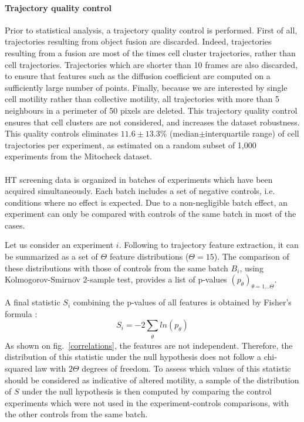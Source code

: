 \paragraph{Trajectory quality control}
 Prior to statistical analysis, a trajectory quality control is performed. First of all, trajectories resulting from object fusion are discarded. Indeed, trajectories resulting from a fusion are most of the times cell cluster trajectories, rather than cell trajectories. Trajectories which are shorter than 10 frames are also discarded, to ensure that features such as the diffusion coefficient are computed on a sufficiently large number of points. Finally, because we are interested by single cell motility rather than collective motility, all trajectories with more than 5 neighbours in a perimeter of 50 pixels are deleted. This trajectory quality control ensures that cell clusters are not considered, and increases the dataset robustness. This quality controls eliminates $11.6\pm 13.3 \%$ (median$\pm$interquartile range) of cell trajectories per experiment, as estimated on a random subset of 1,000 experiments from the Mitocheck dataset.
\paragraph*{}
HT screening data is organized in batches of experiments which have
been acquired simultaneously. Each batch includes a set of negative
controls, i.e. conditions where no effect is expected. Due to a
non-negligible batch effect, an experiment can only be compared with
controls of the same batch in most of the cases. 

Let us consider an experiment $i$. Following to trajectory feature extraction, it can be summarized as a set of $\Theta$ feature distributions ($\Theta = 15$). The comparison of these distributions with those of controls from the same batch $B_i$, using Kolmogorov-Smirnov 2-sample test, provides a list of p-values $(p_\theta)_{\theta=1\ldots\Theta} $. 

A final statistic $S_{i}$ combining the p-values of all features is  obtained by Fisher's formula :
\begin{equation}\label{FisherFormula}
S_{i}=-2 \sum_{\substack{\theta}}ln(p_\theta)
\end{equation}
As shown on fig.~\ref{correlations}, the features are not independent. Therefore, the distribution of this statistic under the null hypothesis does not follow a chi-squared law with $2\Theta$ degrees of freedom. To assess which values of this statistic should be considered as indicative of altered motility, a sample of the distribution of $S$ under the null hypothesis is then computed by comparing the control experiments  which were not used in the experiment-controls comparisons, with the other controls from the same batch.

